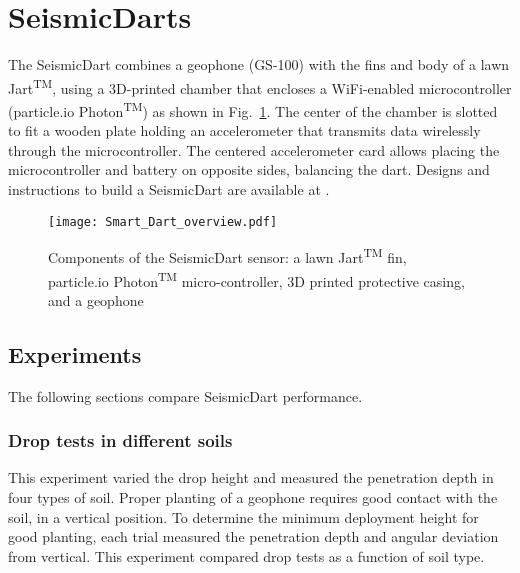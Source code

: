 \section{SeismicDarts}\label{sec:SeismicDarts}

The SeismicDart combines a geophone (GS-100) with the fins and body of a lawn Jart\textsuperscript{TM}, using a 3D-printed chamber that encloses a WiFi-enabled microcontroller (particle.io Photon\textsuperscript{TM}) as shown in Fig.~\ref{fig:Smart_Dart_overview}. 
The center of the chamber is slotted to fit a wooden plate holding an accelerometer that transmits data wirelessly through the microcontroller. 
The centered accelerometer card allows placing the microcontroller and battery on opposite sides, balancing the dart.
Designs and instructions to build a SeismicDart are available at \cite{Victor2016Thingiverse}.



\begin{figure} \centering
{\texttt{[image: Smart\_Dart\_overview.pdf]}}
\caption{Components of the SeismicDart sensor: a lawn  Jart\textsuperscript{TM} fin, particle.io Photon\textsuperscript{TM}  micro-controller, 3D printed protective casing, and a geophone} 
\label{fig:Smart_Dart_overview}
\end{figure}

\subsection{Experiments} 
The following sections compare SeismicDart performance.
\subsubsection{ Drop tests in different soils}  
This experiment varied the drop height and measured the penetration depth in four types of soil. 
Proper planting of a geophone requires good contact with the soil, in a vertical position. 
To determine the minimum deployment height for good planting, each trial measured the penetration depth and angular deviation from vertical. 
This experiment compared drop tests as a function of soil type. 

